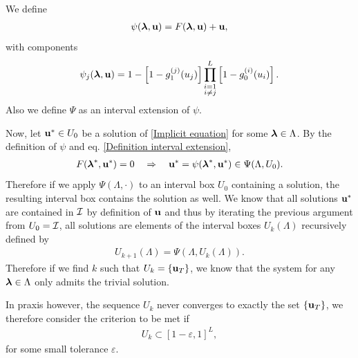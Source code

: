 \documentclass[
11pt, %
english, %
singlespacing, %
liststotoc, %
headsepline, %
]{MastersDoctoralThesis} %
\begin{document}
We define
\begin{align}
	\psi(\boldsymbol{\mathrm{\lambda}}, \boldsymbol{\mathrm{u}}) = F(\boldsymbol{\mathrm{\lambda}}, \boldsymbol{\mathrm{u}}) + \boldsymbol{\mathrm{u}},
\end{align}
with components
\begin{align}
	\psi_j(\boldsymbol{\mathrm{\lambda}}, \boldsymbol{\mathrm{u}}) = 1 - \left[1 - g_1^{(j)}(u_j) \right] \prod_{\substack{i = 1 \\ i \neq j}}^{L}  \left[1 - g_0^{(i)}(u_i) \right].
\end{align}
Also we define $\Psi$ as an interval extension of $\psi$.

Now, let $\boldsymbol{\mathrm{u}}^* \in U_0$ be a solution of \eqref{Implicit equation} for some $\boldsymbol{\mathrm{\lambda}} \in \Lambda$. By the definition of $\psi$ and eq. \eqref{Definition interval extension},
\begin{align}
	F(\boldsymbol{\mathrm{\lambda}}^*, \boldsymbol{\mathrm{u}}^*) = 0 \quad \Rightarrow \quad \boldsymbol{\mathrm{u}}^* = \psi(\boldsymbol{\mathrm{\lambda}}^*, \boldsymbol{\mathrm{u}}^*) \in \Psi(\Lambda, U_0).
\end{align}
Therefore if we apply $\Psi(\Lambda, \cdot)$ to an interval box $U_0$ containing a solution, the resulting interval box contains the solution as well. We know that all solutions $\boldsymbol{\mathrm{u}}^*$ are contained in $\mathcal{I}$ by definition of $\boldsymbol{\mathrm{u}}$ and thus by iterating the previous argument from $U_0 = \mathcal{I}$, all solutions are elements of the interval boxes $U_k(\Lambda)$ recursively defined by
\begin{align}
	U_{k+1}(\Lambda) = \Psi(\Lambda, U_k(\Lambda)). \label{Recursion relation for Uk}
\end{align}
Therefore if we find $k$ such that $U_k = \{\boldsymbol{\mathrm{u}}_T\}$, we know that the system for any $\boldsymbol{\mathrm{\lambda}} \in \Lambda$ only admits the trivial solution.

In praxis however, the sequence $U_k$ never converges to exactly the set $\{\boldsymbol{\mathrm{u}}_T\}$, we therefore consider the criterion to be met if
\begin{align}
	U_k \subset [1 - \varepsilon, 1]^L, \label{Criterion for trivial region}
\end{align}
for some small tolerance $\varepsilon$.
\end{document}
